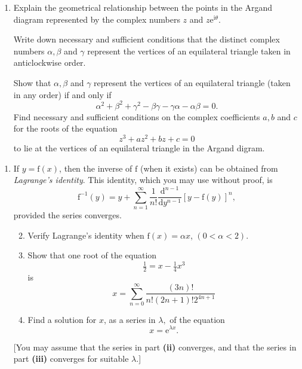 \documentclass[a4, 11pt]{report}
\newlength{\qspace}
\newcounter{qnumber}
\newenvironment{question}%
 {\vspace{\qspace}
  \begin{enumerate}[\bfseries 1\quad][10]%
    \setcounter{enumi}{\value{qnumber}}%
    \item%
 }
{
  \end{enumerate}
  \filbreak
  \stepcounter{qnumber}
 }
\newenvironment{questionparts}[1][1]%
 {
  \begin{enumerate}[\bfseries (i)]%
    \setcounter{enumii}{#1}
    \addtocounter{enumii}{-1}
    \setlength{\itemsep}{5mm}
    \setlength{\parskip}{8pt}
 }
 {
  \end{enumerate}
 }
\begin{document}

\begin{question}
Explain the geometrical relationship between the points in the Argand
diagram represented by the complex numbers $z$ and $z\mathrm{e}^{\mathrm{i}\theta}.$ 


Write down necessary and sufficient conditions that the distinct complex
numbers $\alpha,\beta$ and $\gamma$ represent the vertices of an
equilateral triangle taken in anticlockwise order. 


Show that $\alpha,\beta$ and $\gamma$ represent the vertices of
an equilateral triangle (taken in any order) if and only if 
\[
\alpha^{2}+\beta^{2}+\gamma^{2}-\beta\gamma-\gamma\alpha-\alpha\beta=0.
\]
Find necessary and sufficient conditions on the complex coefficients
$a,b$ and $c$ for the roots of the equation 
\[
z^{3}+az^{2}+bz+c=0
\]
to lie at the vertices of an equilateral triangle in the Argand digram. 


\end{question}


\begin{question}
	If $y=\mathrm{f}(x)$, then the inverse of $\mathrm{f}$ (when it
	exists) can be obtained from\textit{ Lagrange's identity}. This identity,
	which you may use without proof, is
	\[
	\mathrm{f}^{-1}(y)=y+\sum_{n=1}^{\infty}\frac{1}{n!}\frac{\mathrm{d}^{n-1}}{\mathrm{d}y^{n-1}}\left[y-\mathrm{f}\left(y\right)\right]^{n},
	\]
	provided the series converges. 

\begin{questionparts}
	\item Verify Lagrange's identity when $\mathrm{f}(x)=\alpha x$, $(0<\alpha<2)$. 
	\item Show that one root of the equation 
	\[
	\tfrac{1}{2}=x-\tfrac{1}{4}x^{3}
	\]
	 is
	\[
	x=\sum_{n=0}^{\infty}\frac{\left(3n\right)!}{n!\left(2n+1\right)!2^{4n+1}}
	\]

	\item Find a solution for $x$, as a series in $\lambda,$ of the equation
	\[
	x=\mathrm{e}^{\lambda x}.
	\]

\end{questionparts}

	{[}You may assume that the series in part \textbf{(ii) }converges,
	and that the series in part \textbf{(iii) }converges for suitable
	$\lambda$.{]}
	\end{question}
	
\end{document}
